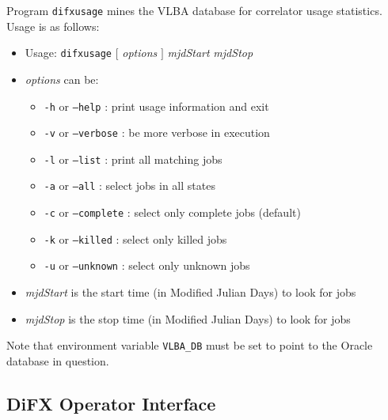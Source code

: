 Program {\tt difxusage} mines the VLBA database for correlator usage statistics.
Usage is as follows:

\begin{itemize}
\item[] Usage: {\tt difxusage} $[$ {\em options} $]$ {\em mjdStart} {\em mjdStop}
\item[] {\em options} can be:
\begin{itemize}
\item[] {\tt -h} or {\tt --help} : print usage information and exit
\item[] {\tt -v} or {\tt --verbose} : be more verbose in execution
\item[] {\tt -l} or {\tt --list} : print all matching jobs
\item[] {\tt -a} or {\tt --all} : select jobs in all states
\item[] {\tt -c} or {\tt --complete} : select only complete jobs (default)
\item[] {\tt -k} or {\tt --killed} : select only killed jobs
\item[] {\tt -u} or {\tt --unknown} : select only unknown jobs
\end{itemize}
\item[] {\em mjdStart} is the start time (in Modified Julian Days) to look for jobs
\item[] {\em mjdStop} is the stop time (in Modified Julian Days) to look for jobs
\end{itemize}

\noindent
Note that environment variable {\tt VLBA\_DB} must be set to point to the Oracle database in question.







\subsection{DiFX Operator Interface} \label{sec:doi}

